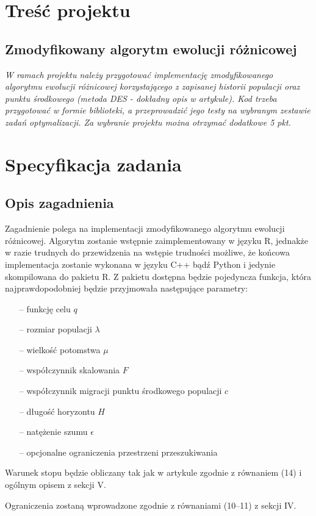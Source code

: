 \chapter{Treść projektu}
\section{Zmodyfikowany algorytm ewolucji różnicowej}
\textit{W ramach projektu należy przygotować implementację zmodyfikowanego algorytmu ewolucji różnicowej korzystającego z zapisanej historii populacji oraz punktu środkowego (metoda DES - dokładny opis w artykule). Kod trzeba przygotować w formie biblioteki, a przeprowadzić jego testy na wybranym zestawie zadań optymalizacji. Za wybranie projektu można otrzymać dodatkowe 5 pkt.}

\chapter{Specyfikacja zadania}
\section{Opis zagadnienia}
Zagadnienie polega na implementacji zmodyfikowanego algorytmu ewolucji różnicowej. Algorytm zostanie wstępnie zaimplementowany w języku R, jednakże w razie trudnych do przewidzenia na wstępie trudności możliwe, że końcowa implementacja zostanie wykonana w języku C++ bądź Python i jedynie skompilowana do pakietu R. Z pakietu dostępna będzie pojedyncza funkcja, która najprawdopodobniej będzie przyjmowała następujące parametry:
\begin{itemize}
\item[--] funkcję celu $q$
\item[--] rozmiar populacji $\lambda$
\item[--] wielkość potomstwa $\mu$
\item[--] współczynnik skalowania $F$
\item[--] współczynnik migracji punktu środkowego populacji $c$
\item[--] długość horyzontu $H$
\item[--] natężenie szumu $\epsilon$
\item[--] opcjonalne ograniczenia przestrzeni przeszukiwania
\end{itemize}

Warunek stopu będzie obliczany tak jak w artykule zgodnie z równaniem (14) i ogólnym opisem z sekcji V.

Ograniczenia zostaną wprowadzone zgodnie z równaniami (10--11) z sekcji IV\@.

